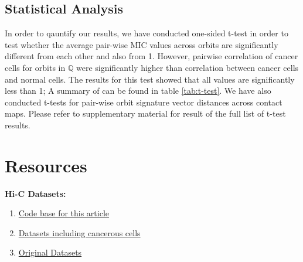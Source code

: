 \documentclass[a4,center,fleqn]{NAR}
\begin{document}
\subsection{Statistical Analysis}
In order to qauntify our results, we have conducted one-sided
t-test in order to test whether the average pair-wise
MIC values across orbits are significantly different from 
each other and also from 1. 
However, pairwise correlation of cancer cells for
orbits in $\mathbb{Q}$ were significantly higher than
correlation between cancer cells and normal cells.
The results
for this test showed that all values are significantly less than 1;
A summary of can be found in
table \ref{tab:t-test}.
We have also conducted t-tests for 
pair-wise orbit signature vector distances across contact maps.
Please refer to supplementary material for result of the 
full list of t-test results.

\section{Resources}
\textbf{Hi-C Datasets:}
\begin{enumerate}
    \item \href{https://github.com/rasoolianbehnam/watson}{Code base for this article}
    \item \href{http://sysbio.rnet.missouri.edu/T0510/tmp_download/link_to_download_genome_data/}
        {Datasets including cancerous cells}
    \item \href{https://bcm.app.box.com/v/aidenlab/folder/11234760671}{Original Datasets}
\end{enumerate}



\end{document}
